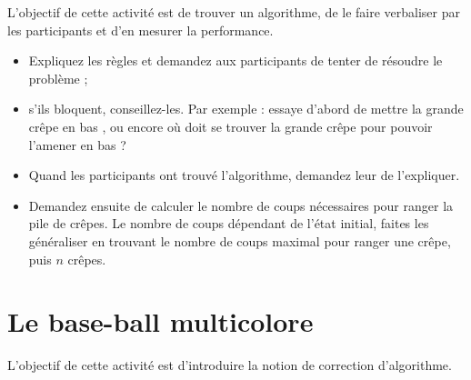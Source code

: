 \documentclass[a5paper,pagesize,DIV=14]{scrbook}
\begin{document}
L'objectif de cette activité est de trouver un algorithme, de le faire verbaliser par les participants et d'en mesurer la performance.

\begin{itemize}
  \item Expliquez les règles et demandez aux participants de tenter de résoudre le problème ;
  \item s'ils bloquent, conseillez-les. Par exemple : \og essaye d'abord de mettre la grande crêpe en bas \fg, ou encore \og où doit se trouver la grande crêpe pour pouvoir l'amener en bas ? \fg
  \item Quand les participants ont trouvé l'algorithme, demandez leur de l'expliquer. 
  \item Demandez ensuite de calculer le nombre de coups nécessaires pour ranger la pile de crêpes. Le nombre de coups dépendant de l'état initial, faites les généraliser en trouvant le nombre de coups maximal pour ranger une crêpe, puis $n$ crêpes.
\end{itemize}

\section*{Le base-ball multicolore}

L'objectif de cette activité est d'introduire la notion de correction d'algorithme.
\end{document}
